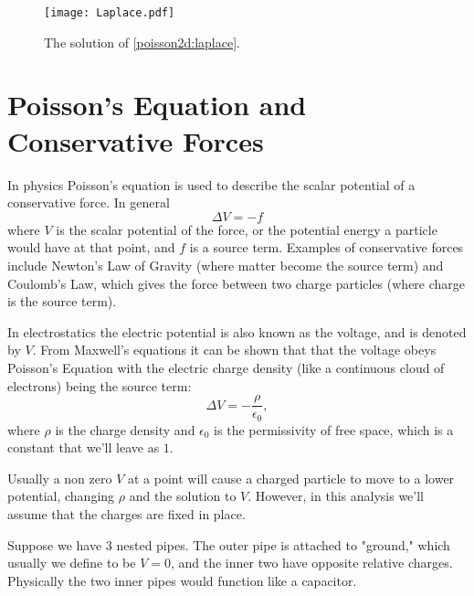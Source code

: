 \begin{figure}
\texttt{[image: Laplace.pdf]}
\caption{The solution of \eqref{poisson2d:laplace}.}
\end{figure}

\section*{Poisson's Equation and Conservative Forces}
In physics Poisson's equation is used to describe the scalar potential of a conservative force.
In general
$$ \Delta V = - f$$
where $V$ is the scalar potential of the force,
or the potential energy a particle would have at that point,
and $f$ is a source term.
Examples of conservative forces include Newton's Law of Gravity (where matter become the source term) and Coulomb's Law,
which gives the force between two charge particles (where charge is the source term).

In electrostatics the electric potential is also known as the voltage, and is denoted by $V.$ 
From Maxwell's equations it can be shown that that the voltage obeys Poisson's Equation with the electric charge density (like a continuous cloud of electrons) being the source term: 
\[
 \Delta V = -\frac{\rho}{\epsilon_0},
\]
where $\rho$ is the charge density and $\epsilon_0$ is the permissivity of 
free space, which is a constant that we'll leave as $1$.

Usually a non zero $V$ at a point will cause a charged particle to move to a lower potential, changing $\rho$ and the solution to $V$.
However, in this analysis we'll assume that the charges are fixed in place.

Suppose we have 3 nested pipes.
The outer pipe is attached to "ground," which usually we define to be $V=0$, and the inner two have opposite relative charges.
Physically the two inner pipes would function like a capacitor.

